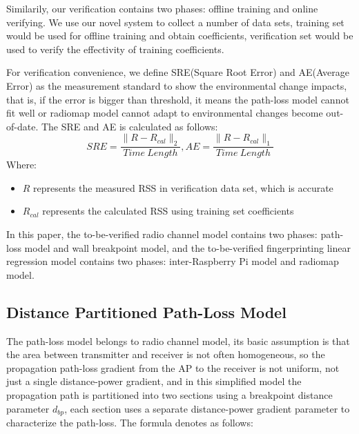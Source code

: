 \documentclass[10pt,conference]{IEEEtran}
\begin{document}
Similarily, our verification contains two phases: offline training and online verifying. We use our novel system to collect a number of data sets, training set would be used for offline training and obtain coefficients, verification set would be used to verify the effectivity of training coefficients.

For verification convenience, we define SRE(Square Root Error) and AE(Average Error) as the measurement standard to show the environmental change impacts, that is, if the error is bigger than threshold, it means the path-loss model cannot fit well or radiomap model cannot adapt to environmental changes become out-of-date. The SRE and AE is calculated as follows:
$$SRE = \dfrac{\Big\lVert R-R_{cal} \Big\rVert_2}{Time\ Length}, AE = \dfrac{\Big\lVert R-R_{cal} \Big\rVert_1}{Time\ Length}$$
Where:
\begin{itemize}
	\item $R$ represents the measured RSS in verification data set, which is accurate
	\item $R_{cal}$ represents the calculated RSS using training set coefficients
\end{itemize}
In this paper, the to-be-verified radio channel model contains two phases: path-loss model and wall breakpoint model, and the to-be-verified fingerprinting linear regression model contains two phases: inter-Raspberry Pi model and radiomap model.

\subsection{Distance Partitioned Path-Loss Model}
The path-loss model belongs to radio channel model, its basic assumption is that the area between transmitter and receiver is not often homogeneous, so the propagation path-loss gradient from the AP to the receiver is not uniform, not just a single distance-power gradient, and in this simplified model the propagation path is partitioned into two sections using a breakpoint distance parameter $d_{bp}$, each section uses a separate distance-power gradient parameter to characterize the path-loss. The formula denotes as follows:
\end{document}
